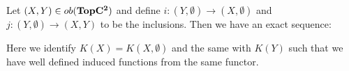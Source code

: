\begin{lemma} \label{lem: Exact part for pairs}
	Let $(X,Y)\in ob(\operatorname{\mathbf{TopC^2}})$ and define $i:(Y,\emptyset) \to (X,\emptyset)$ and $j:(Y,\emptyset)\to(X,Y)$ to be the inclusions. Then we have an exact sequence:
	\begin{center}
	\end{center}
	Here we identify $K(X)=K(X,\emptyset)$ and the same with $K(Y)$ such that we have well defined induced functions from the same functor.
\end{lemma}
